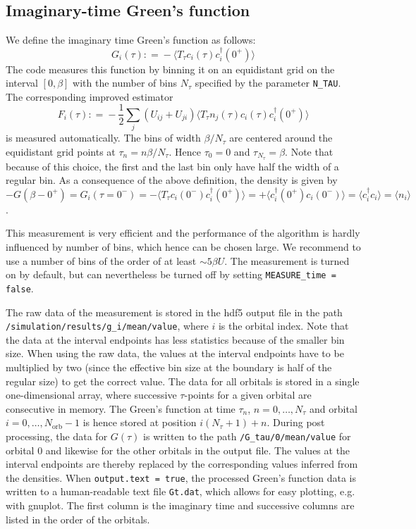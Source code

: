 \documentclass[aps,prb,floatfix,superscriptaddress,twocolumn,notitlepage]{revtex4-1}
\newcommand\Let{\mathrel{\mathop:\!\!=}}
\begin{document}
\subsection{Imaginary-time Green's function}
\label{gtmeas}

We define the imaginary time Green's function as follows:
\begin{equation}
G_{i}(\tau) \Let -\langle T_{\tau}c_{i}(\tau)c_{i}^{\dagger}(0^{+})\rangle
\label{Gtdef}
\end{equation}
The code measures this function by binning it on an equidistant grid on the interval $[0,\beta]$ with the number of bins $N_{\tau}$ specified by the parameter \verb#N_TAU#. The corresponding improved estimator
\begin{equation}
F_{i}(\tau) \Let -\frac{1}{2}\sum_{j}(U_{ij}+U_{ji})\langle T_{\tau}n_{j}(\tau)c_{i}(\tau)c_{i}^{\dagger}(0^{+})\rangle
\label{Ftdef}
\end{equation}
is measured automatically.
The bins of width $\beta/N_{\tau}$ are centered around the equidistant grid points at $\tau_{n}=n\beta/N_{\tau}$. Hence $\tau_{0}=0$ and $\tau_{N_{\tau}}=\beta$. Note that because of this choice, the first and the last bin only have half the width of a regular bin.
As a consequence of the above definition, the density is given by
$-G(\beta-0^{+})=G_{i}(\tau=0^{-})=-\langle T_{\tau} c_{i}(0^{-})c_{i}^{\dagger}(0^{+})\rangle = +\langle c_{i}^{\dagger}(0^{+}) c_{i}(0^{-})\rangle =\langle c_{i}^{\dagger} c_{i}\rangle = \langle n_{i} \rangle$.

This measurement is very efficient and the performance of the algorithm is hardly influenced by number of bins, which hence can be chosen large. We recommend to use a number of bins of the order of at least $\sim 5\beta U$. The measurement is turned on by default, but can nevertheless be turned off by setting \verb#MEASURE_time = false#.

The raw data of the measurement is stored in the hdf5 output file in the path \verb#/simulation/results/g_i/mean/value#, where $i$ is the orbital index. Note that the data at the interval endpoints has less statistics because of the smaller bin size. When using the raw data, the values at the interval endpoints have to be multiplied by two (since the effective bin size at the boundary is half of the regular size) to get the correct value. The data for all orbitals is stored in a single one-dimensional array, where successive $\tau$-points for a given orbital are consecutive in memory. The Green's function at time $\tau_{n}$, $n=0,\ldots,N_{\tau}$ and orbital $i=0,\ldots,N_{\text{orb}}-1$ is hence stored at position $i(N_{\tau}+1)+n$.
During post processing, the data for $G(\tau)$ is written to the path \verb#/G_tau/0/mean/value# for orbital $0$ and likewise for the other orbitals in the output file. The values at the interval endpoints are thereby replaced by the corresponding values inferred from the densities.
When \verb#output.text = true#, the processed Green's function data is written to a human-readable text file \verb#Gt.dat#, which allows for easy plotting, e.g. with gnuplot. The first column is the imaginary time and successive columns are listed in the order of the orbitals.
\end{document}
